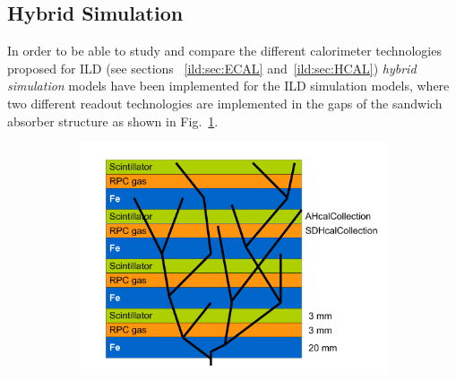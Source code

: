 \subsection{\label{sec:hybrid-sim} Hybrid Simulation}

In order to be able to study and compare the different calorimeter technologies proposed for ILD
(see sections ~\ref{ild:sec:ECAL} and~\ref{ild:sec:HCAL}) \emph{hybrid simulation} models have been implemented for the
ILD simulation models, where two different readout technologies are implemented in the
gaps of the sandwich absorber structure as shown in Fig.~\ref{fig:sim_hybrid_schema}.
%
\begin{figure}[b!]
  \begin{subfigure}{0.50\hsize}
    \includegraphics[width=\textwidth]{Modelling/fig/multi_technology_simulation.pdf}
    \caption{ \label{fig:sim_hybrid_schema}}
  \end{subfigure}
  \begin{subfigure}{0.49\hsize}

\end{subfigure}
\end{figure}
